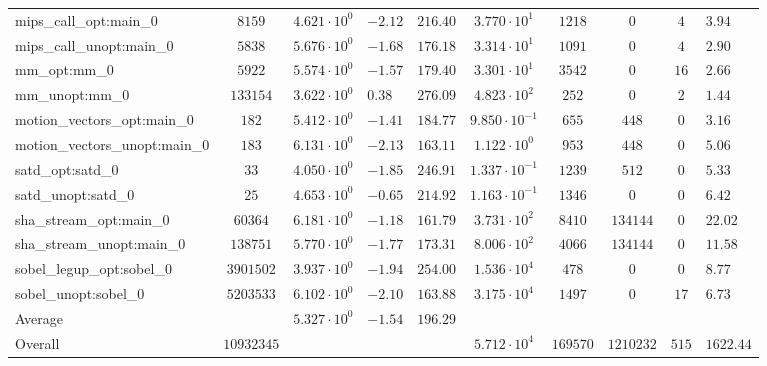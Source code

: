 \begin{tabular}{|l|c|HHc|c|c|c|cH|}
mips\_call\_opt:main\_0                         & $ 8159     $ & $ 4.621 \cdot 10^{0} $ & $ -2.12 $ & $ 216.40 $ & $ 3.770 \cdot 10^{1}  $ & $ 1218   $ & $ 0       $ & $ 4   $ & $ 3.94    $ \\
mips\_call\_unopt:main\_0                       & $ 5838     $ & $ 5.676 \cdot 10^{0} $ & $ -1.68 $ & $ 176.18 $ & $ 3.314 \cdot 10^{1}  $ & $ 1091   $ & $ 0       $ & $ 4   $ & $ 2.90    $ \\
mm\_opt:mm\_0                                   & $ 5922     $ & $ 5.574 \cdot 10^{0} $ & $ -1.57 $ & $ 179.40 $ & $ 3.301 \cdot 10^{1}  $ & $ 3542   $ & $ 0       $ & $ 16  $ & $ 2.66    $ \\
mm\_unopt:mm\_0                                 & $ 133154   $ & $ 3.622 \cdot 10^{0} $ & $ 0.38  $ & $ 276.09 $ & $ 4.823 \cdot 10^{2}  $ & $ 252    $ & $ 0       $ & $ 2   $ & $ 1.44    $ \\
motion\_vectors\_opt:main\_0                    & $ 182      $ & $ 5.412 \cdot 10^{0} $ & $ -1.41 $ & $ 184.77 $ & $ 9.850 \cdot 10^{-1} $ & $ 655    $ & $ 448     $ & $ 0   $ & $ 3.16    $ \\
motion\_vectors\_unopt:main\_0                  & $ 183      $ & $ 6.131 \cdot 10^{0} $ & $ -2.13 $ & $ 163.11 $ & $ 1.122 \cdot 10^{0}  $ & $ 953    $ & $ 448     $ & $ 0   $ & $ 5.06    $ \\
satd\_opt:satd\_0                               & $ 33       $ & $ 4.050 \cdot 10^{0} $ & $ -1.85 $ & $ 246.91 $ & $ 1.337 \cdot 10^{-1} $ & $ 1239   $ & $ 512     $ & $ 0   $ & $ 5.33    $ \\
satd\_unopt:satd\_0                             & $ 25       $ & $ 4.653 \cdot 10^{0} $ & $ -0.65 $ & $ 214.92 $ & $ 1.163 \cdot 10^{-1} $ & $ 1346   $ & $ 0       $ & $ 0   $ & $ 6.42    $ \\
sha\_stream\_opt:main\_0                        & $ 60364    $ & $ 6.181 \cdot 10^{0} $ & $ -1.18 $ & $ 161.79 $ & $ 3.731 \cdot 10^{2}  $ & $ 8410   $ & $ 134144  $ & $ 0   $ & $ 22.02   $ \\
sha\_stream\_unopt:main\_0                      & $ 138751   $ & $ 5.770 \cdot 10^{0} $ & $ -1.77 $ & $ 173.31 $ & $ 8.006 \cdot 10^{2}  $ & $ 4066   $ & $ 134144  $ & $ 0   $ & $ 11.58   $ \\
sobel\_legup\_opt:sobel\_0                      & $ 3901502  $ & $ 3.937 \cdot 10^{0} $ & $ -1.94 $ & $ 254.00 $ & $ 1.536 \cdot 10^{4}  $ & $ 478    $ & $ 0       $ & $ 0   $ & $ 8.77    $ \\
sobel\_unopt:sobel\_0                           & $ 5203533  $ & $ 6.102 \cdot 10^{0} $ & $ -2.10 $ & $ 163.88 $ & $ 3.175 \cdot 10^{4}  $ & $ 1497   $ & $ 0       $ & $ 17  $ & $ 6.73    $ \\
\hline
Average                                         & $          $ & $ 5.327 \cdot 10^{0} $ & $ -1.54 $ & $ 196.29 $ & $                     $ & $        $ & $         $ & $     $ & $         $ \\
\hline
Overall                                         & $ 10932345 $ & $                    $ & $       $ & $        $ & $ 5.712 \cdot 10^{4}  $ & $ 169570 $ & $ 1210232 $ & $ 515 $ & $ 1622.44 $ \\
\hline
\end{tabular}
